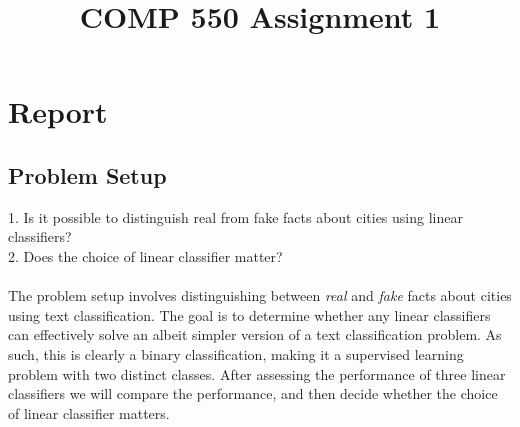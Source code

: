 \documentclass{article}
\title{COMP 550 Assignment 1}
\begin{document}
\maketitle

\section*{Report}
\subsection{Problem Setup}
1. Is it possible to distinguish real from fake facts about cities using linear classifiers?\\
2. Does the choice of linear classifier matter?\\\\
The problem setup involves distinguishing between \textit{real} and \textit{fake} facts about cities using text classification. The goal is to determine whether any linear classifiers can effectively solve an albeit simpler version of a text classification problem. As such, this is clearly a binary classification, making it a supervised learning problem with two distinct classes. After assessing the performance of three linear classifiers we will compare the performance, and then decide whether the choice of linear classifier matters. 
\end{document}
